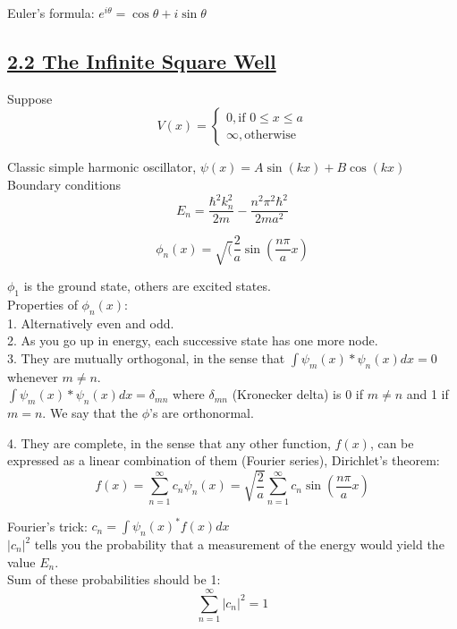 Euler's formula: $e^{i \theta} = \cos \theta + i \sin \theta$

\subsection{\underline{2.2 The Infinite Square Well}}

Suppose
    $$V(x) = \begin{cases} 0, \textrm{if } 0 \leq x \leq a \\ \infty, \textrm{otherwise} \end{cases}$$

Classic simple harmonic oscillator, $\psi(x) = A \sin(kx) + B \cos(kx)$ \\

Boundary conditions \\

$$E_n = \frac{\hbar^2 k_n^2}{2m} - \frac{n^2 \pi^2 \hbar^2}{2ma^2}$$

$$\phi_n(x) = \sqrt(\frac{2}{a} \sin(\frac{n \pi}{a} x)$$

$\phi_1$ is the ground state, others are excited states. \\

Properties of $\phi_n(x)$: \\
1. Alternatively even and odd. \\
2. As you go up in energy, each successive state has one more node. \\
3. They are mutually orthogonal, in the sense that $\int \psi_m(x)* \psi_n(x) dx = 0$ whenever $m \neq n$. \\

$\int \psi_m (x)* \psi_n(x) dx = \delta_{mn}$
where $\delta_{mn}$ (Kronecker delta) is 0 if $m \neq n$ and 1 if $m=n$. We say that the $\phi$'s are orthonormal.

4. They are complete, in the sense that any other function, $f(x)$, can be expressed as a linear combination of them (Fourier series), Dirichlet's theorem:
    $$f(x) = \sum_{n=1}^{\infty} c_n \psi_n(x) = \sqrt{\frac{2}{a}} \sum_{n=1}^{\infty} c_n \sin(\frac{n \pi}{a} x)$$

Fourier's trick: $c_n = \int \psi_n(x)^* f(x) dx$ \\

$|c_n|^2$ tells you the probability that a measurement of the energy would yield the value $E_n$. \\

Sum of these probabilities should be 1: 
    $$\sum_{n=1}^{\infty} |c_n|^2 = 1$$

